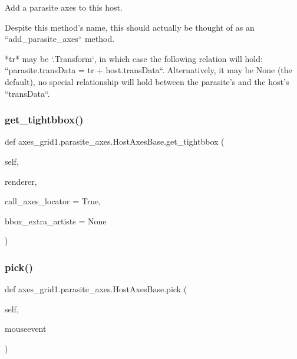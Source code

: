 \begin{DoxyVerb}Add a parasite axes to this host.

Despite this method's name, this should actually be thought of as an
``add_parasite_axes`` method.

*tr* may be `.Transform`, in which case the following relation will
hold: ``parasite.transData = tr + host.transData``.  Alternatively, it
may be None (the default), no special relationship will hold between
the parasite's and the host's ``transData``.
\end{DoxyVerb}
 \mbox{\label{classaxes__grid1_1_1parasite__axes_1_1HostAxesBase_afbdaab27b1dd240b2f2f4f69e155ea53}} 
\subsubsection{\texorpdfstring{get\+\_\+tightbbox()}{get\_tightbbox()}}
{\footnotesize\ttfamily def axes\+\_\+grid1.\+parasite\+\_\+axes.\+Host\+Axes\+Base.\+get\+\_\+tightbbox (\begin{DoxyParamCaption}\item[{}]{self,  }\item[{}]{renderer,  }\item[{}]{call\+\_\+axes\+\_\+locator = {\ttfamily True},  }\item[{}]{bbox\+\_\+extra\+\_\+artists = {\ttfamily None} }\end{DoxyParamCaption})}

\mbox{\label{classaxes__grid1_1_1parasite__axes_1_1HostAxesBase_a68bb93fa87e4edfcebdc08862e03dd28}} 
\subsubsection{\texorpdfstring{pick()}{pick()}}
{\footnotesize\ttfamily def axes\+\_\+grid1.\+parasite\+\_\+axes.\+Host\+Axes\+Base.\+pick (\begin{DoxyParamCaption}\item[{}]{self,  }\item[{}]{mouseevent }\end{DoxyParamCaption})}

